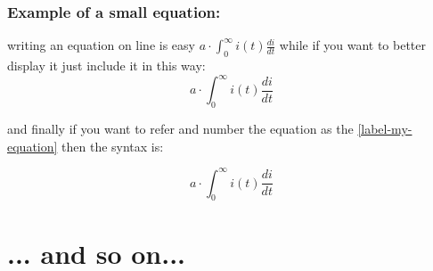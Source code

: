 \subsection{Example of a small equation:}

writing an equation on line is easy $a \cdot \int^{\infty}_0 i(t)
\frac{di}{dt}$
while if you want to better display it just include it in this way:
$$a \cdot \int^{\infty}_0 i(t) \frac{di}{dt}$$

and finally if you want to refer and number the equation as the
\ref{label-my-equation} then the syntax is:

\begin{equation}
a \cdot \int^{\infty}_0 i(t) \frac{di}{dt}
\label{label-my-equation}
\end{equation}

\chapter{... and so on...}



